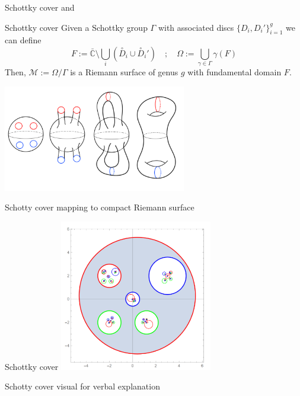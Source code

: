 \documentclass[11pt,aspectratio=169]{beamer}
\begin{document}
\begin{frame}{Schottky cover}{\tiny \cite{ComputationalSchottky} and \cite{Cha22}}
    \begin{block}{Schottky cover}
        Given a Schottky group $\Gamma$ with associated discs $\{D_i,D_i'\}_{i=1}^g$ we can define
        \[F := \bar {\mathbb C} \setminus \bigcup_i (\overset{\circ}{D}_i \cup \overset{\circ}{D}_i') \quad ; \quad \Omega := \bigcup_{\gamma \in \Gamma} \gamma(F)\]
        Then, $\mathcal M := \Omega / \Gamma$ is a Riemann surface of genus $g$ with fundamental domain $F$.
    \end{block}
    \center{}
    \includegraphics[width=0.6\textwidth]{assets/ChanSchottkyCover.png}

    \tiny Schotty cover mapping to compact Riemann surface

    \cite{Cha22}
\end{frame}

\begin{frame}{Schottky cover}{\tiny \cite{Cha22}}
    \center{}
    \includegraphics[width=0.5\textwidth]{assets/ChanSchottkyCover2.png}

    \tiny Schotty cover visual for verbal explanation

    \cite{Cha22}
\end{frame}
\end{document}
